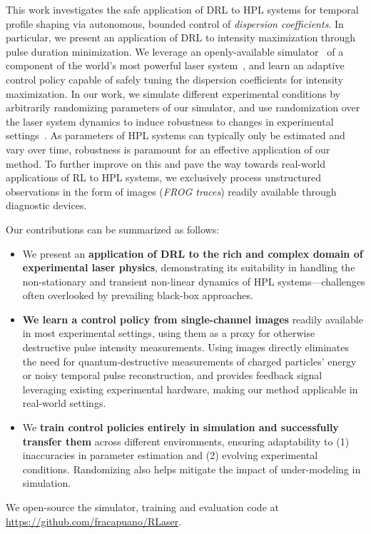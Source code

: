 This work investigates the safe application of DRL to HPL systems for temporal profile shaping via autonomous, bounded control of \textit{dispersion coefficients}. 
In particular, we present an application of DRL to intensity maximization through pulse duration minimization. 
We leverage an openly-available simulator~\citep{capuano2023temporl} of a component of the world's most powerful laser system~\citep{batysta2014pulse}, and learn an adaptive control policy capable of safely tuning the dispersion coefficients for intensity maximization. 
In our work, we simulate different experimental conditions by arbitrarily randomizing parameters of our simulator, and use randomization over the laser system dynamics to induce robustness to changes in experimental settings~\citep{tiboni2023domain}.
As parameters of HPL systems can typically only be estimated and vary over time, robustness is paramount for an effective application of our method. To further improve on this and pave the way towards real-world applications of RL to HPL systems, we exclusively process unstructured observations in the form of images (\textit{FROG traces}) readily available through diagnostic devices. 

Our contributions can be summarized as follows:
\begin{itemize}
    \item We present an \textbf{application of DRL to the rich and complex domain of experimental laser physics}, demonstrating its suitability in handling the non-stationary and transient non-linear dynamics of HPL systems---challenges often overlooked by prevailing black-box approaches.
    \item \textbf{We learn a control policy from single-channel images} readily available in most experimental settings, using them as a proxy for otherwise destructive pulse intensity measurements. Using images directly eliminates the need for quantum-destructive measurements of charged particles' energy or noisy temporal pulse reconstruction, and provides feedback signal leveraging existing experimental hardware, making our method applicable in real-world settings.
    \item We \textbf{train control policies entirely in simulation and successfully transfer them} across different environments, ensuring adaptability to (1) inaccuracies in parameter estimation and (2) evolving experimental conditions. Randomizing also helps mitigate the impact of under-modeling in simulation.
\end{itemize}

We open-source the simulator, training and evaluation code at \url{https://github.com/fracapuano/RLaser}.